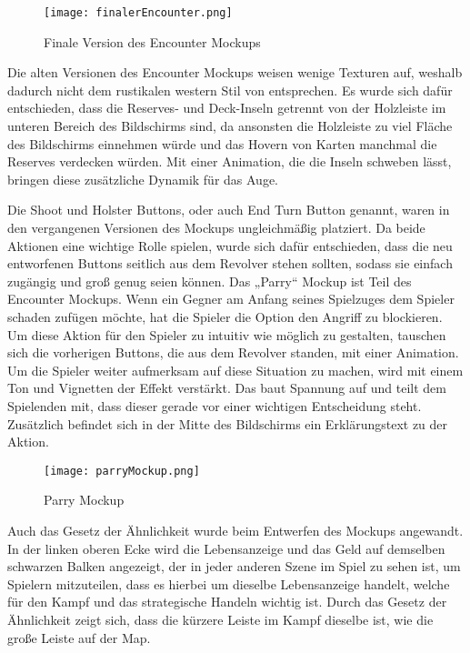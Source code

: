 \begin{figure}[H]
    \centering
    \texttt{[image: finalerEncounter.png]}
    \caption{Finale Version des Encounter Mockups}
\end{figure}

Die alten Versionen des Encounter Mockups weisen wenige Texturen auf, weshalb dadurch nicht dem rustikalen western Stil von \FF entsprechen. Es wurde sich dafür entschieden, dass die Reserves- und Deck-Inseln getrennt von der Holzleiste im unteren Bereich des Bildschirms sind, da ansonsten die Holzleiste zu viel Fläche des Bildschirms einnehmen würde und das Hovern von Karten manchmal die Reserves verdecken würden. Mit einer Animation, die die Inseln schweben lässt, bringen diese zusätzliche Dynamik für das Auge.

Die Shoot und Holster Buttons, oder auch End Turn Button genannt, waren in den vergangenen Versionen des Mockups ungleichmäßig platziert. Da beide Aktionen eine wichtige Rolle spielen, wurde sich dafür entschieden, dass die neu entworfenen Buttons seitlich aus dem Revolver stehen sollten, sodass sie einfach zugängig und groß genug seien können.
Das „Parry“ Mockup ist Teil des Encounter Mockups. Wenn ein Gegner am Anfang seines Spielzuges dem Spieler schaden zufügen möchte, hat die Spieler die Option den Angriff zu blockieren. Um diese Aktion für den Spieler zu intuitiv wie möglich zu gestalten, tauschen sich die vorherigen Buttons, die aus dem Revolver standen, mit einer Animation. Um die Spieler weiter aufmerksam auf diese Situation zu machen, wird mit einem Ton und Vignetten der Effekt verstärkt. Das baut Spannung auf und teilt dem Spielenden mit, dass dieser gerade vor einer wichtigen Entscheidung steht. Zusätzlich befindet sich in der Mitte des Bildschirms ein Erklärungstext zu der Aktion.

\begin{figure}[H]
    \centering
    \texttt{[image: parryMockup.png]}
    \caption{Parry Mockup}
\end{figure}

Auch das Gesetz der Ähnlichkeit wurde beim Entwerfen des Mockups angewandt. In der linken oberen Ecke wird die Lebensanzeige und das Geld auf demselben schwarzen Balken angezeigt, der in jeder anderen Szene im Spiel zu sehen ist, um Spielern mitzuteilen, dass es hierbei um dieselbe Lebensanzeige handelt, welche für den Kampf und das strategische Handeln wichtig ist. Durch das Gesetz der Ähnlichkeit zeigt sich, dass die kürzere Leiste im Kampf dieselbe ist, wie die große Leiste auf der Map.

